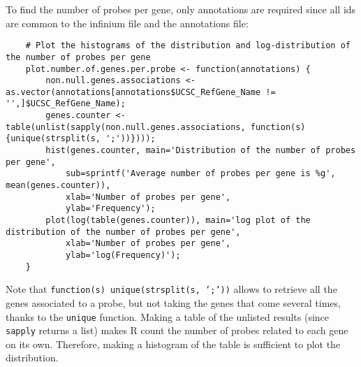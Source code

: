 \documentclass{article}
\begin{document}
To find the number of probes per gene, only annotations are required since all ids are common to the infinium file and the annotations file:
\begin{lstlisting}
	# Plot the histograms of the distribution and log-distribution of the number of probes per gene
	plot.number.of.genes.per.probe <- function(annotations) {
		non.null.genes.associations <- as.vector(annotations[annotations$UCSC_RefGene_Name != '',]$UCSC_RefGene_Name);
		genes.counter <- table(unlist(sapply(non.null.genes.associations, function(s) {unique(strsplit(s, ';'))})));
		hist(genes.counter, main='Distribution of the number of probes per gene',
			sub=sprintf('Average number of probes per gene is %g', mean(genes.counter)),
			xlab='Number of probes per gene',
			ylab='Frequency');
		plot(log(table(genes.counter)), main='log plot of the distribution of the number of probes per gene',
			xlab='Number of probes per gene',
			ylab='log(Frequency)');
	}
\end{lstlisting}

Note that \texttt{function(s) {unique(strsplit(s, ';'))}} allows to retrieve all the genes associated to a probe, but not taking
the genes that come several times, thanks to the \texttt{unique} function. Making a table of the unlisted results (since
\texttt{sapply} returns a list) makes R count the number of probes related to each gene on its own. Therefore, making a histogram
of the table is sufficient to plot the distribution.

\newpage

{}
\end{document}
